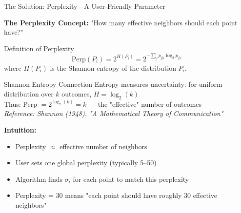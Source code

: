 \documentclass[10pt]{beamer}
\begin{document}
\begin{frame}{The Solution: Perplexity—A User-Friendly Parameter}

\textbf{The Perplexity Concept:} "How many effective neighbors should each point have?"

\vspace{0.15cm}
\begin{block}{Definition of Perplexity}
\begin{equation}
\text{Perp}(P_i) = 2^{H(P_i)} = 2^{-\sum_j p_{j|i} \log_2 p_{j|i}}
\end{equation}
where $H(P_i)$ is the Shannon entropy of the distribution $P_i$.
\end{block}

\vspace{0.1cm}
\begin{exampleblock}{Shannon Entropy Connection}
\footnotesize
Entropy measures uncertainty: for uniform distribution over $k$ outcomes, $H = \log_2(k)$\\
Thus: Perp $= 2^{\log_2(k)} = k$ — the "effective" number of outcomes\\
\textit{Reference: Shannon (1948), "A Mathematical Theory of Communication"}
\end{exampleblock}

\vspace{0.1cm}
\textbf{Intuition:}
\begin{itemize}
    \setlength\itemsep{0em}
    \item Perplexity $\approx$ effective number of neighbors
    \item User sets one global perplexity (typically 5–50)
    \item Algorithm finds $\sigma_i$ for each point to match this perplexity
    \item Perplexity = 30 means "each point should have roughly 30 effective neighbors"
\end{itemize}

\vspace{0.05cm}
\begin{figure}
\centering
{}
\end{figure}
\end{frame}
\end{document}
